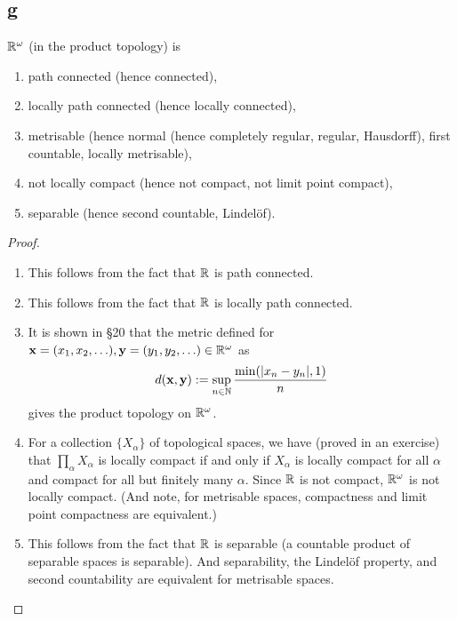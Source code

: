 
\subsection*{g}
  $\mathbb{R}^\omega$ (in the product topology) is
  \begin{enumerate}
  \item path connected (hence connected), 
  \item locally path connected (hence locally connected),
  \item metrisable (hence normal (hence completely regular, regular, Hausdorff), first countable, locally metrisable),
  \item not locally compact (hence not compact, not limit point compact),
  \item separable (hence second countable, Lindel\"of).
  \end{enumerate}

\begin{proof}
  \begin{enumerate}[leftmargin=*]
  \item This follows from the fact that $\mathbb{R}$ is path connected.
  \item This follows from the fact that $\mathbb{R}$ is locally path connected.
  \item It is shown in \S 20 that the metric defined for $\boldsymbol{\mathbf{x}} = (x_1,x_2,\ldots), \boldsymbol{\mathbf{y}} = (y_1,y_2,\ldots) \in \mathbb{R}^\omega$ as
\[ d(\boldsymbol{\mathbf{x}}, \boldsymbol{\mathbf{y}}) := \sup_{n \in \mathbb{N}} \frac{\min(|x_n - y_n|, 1)}n \]
gives the product topology on $\mathbb{R}^\omega$.
  \item For a collection $\{X_\alpha\}$ of topological spaces, we have (proved in an exercise) that $\prod_\alpha X_\alpha$ is locally compact if and only if $X_\alpha$ is locally compact for all $\alpha$ and compact for all but finitely many $\alpha$. Since $\mathbb{R}$ is not compact, $\mathbb{R}^\omega$ is not locally compact. (And note, for metrisable spaces, compactness and limit point compactness are equivalent.)
  \item This follows from the fact that $\mathbb{R}$ is separable (a countable product of separable spaces is separable). And separability, the Lindel\"of property, and second countability are equivalent for metrisable spaces. \qedhere
  \end{enumerate}
\end{proof}


